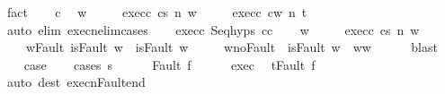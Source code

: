 \begin{isabellebody}
\ fact\isanewline
\ \ \isamarkupfalse%
\ c\ \isamarkupfalse%
\ w\ \isanewline
\ \ \ \ exec{\isacharunderscore}c{}{\isacharcolon}\ {\isachardoublequoteopen}{\isasymGamma}{\isasymturnstile}{\isasymlangle}c{}{\isacharcomma}s{\isasymrangle}\ {\isacharequal}n{\isasymRightarrow}\ w{\isachardoublequoteclose}\ \isanewline
\ \ \ \ exec{\isacharunderscore}c{}{\isacharcolon}\ {\isachardoublequoteopen}{\isasymGamma}{\isasymturnstile}{\isasymlangle}c{}{\isacharcomma}w{\isasymrangle}\ {\isacharequal}n{\isasymRightarrow}\ t{\isachardoublequoteclose}\isanewline
\ \ \ \ \isamarkupfalse%
\ {\isacharparenleft}auto\ elim{\isacharcolon}\ execn{\isacharunderscore}elim{\isacharunderscore}cases{\isacharparenright}\isanewline
\ \ \isamarkupfalse%
\ exec{\isacharunderscore}c{}\ Seq{\isachardot}hyps\ c{}{\isacharunderscore}c{}{\isacharprime}\isanewline
\ \ \isamarkupfalse%
\ w{\isacharprime}\ \isanewline
\ \ \ \ exec{\isacharunderscore}c{}{\isacharprime}{\isacharcolon}\ {\isachardoublequoteopen}{\isasymGamma}{\isasymturnstile}{\isasymlangle}c{}{\isacharprime}{\isacharcomma}s{\isasymrangle}\ {\isacharequal}n{\isasymRightarrow}\ w{\isacharprime}{\isachardoublequoteclose}\ \isanewline
\ \ \ \ w{\isacharunderscore}Fault{\isacharcolon}\ {\isachardoublequoteopen}isFault\ w\ {\isasymlongrightarrow}\ isFault\ w{\isacharprime}{\isachardoublequoteclose}\ \isanewline
\ \ \ \ w{\isacharprime}{\isacharunderscore}noFault{\isacharcolon}\ {\isachardoublequoteopen}{\isasymnot}\ isFault\ w{\isacharprime}\ {\isasymlongrightarrow}\ w{\isacharprime}{\isacharequal}w{\isachardoublequoteclose}\isanewline
\ \ \ \ \isamarkupfalse%
\ blast\isanewline
\ \ \isamarkupfalse%
\ {\isacharquery}case\isanewline
\ \ \isamarkupfalse%
\ {\isacharparenleft}cases\ {\isachardoublequoteopen}s{\isachardoublequoteclose}{\isacharparenright}\isanewline
\ \ \ \ \isamarkupfalse%
\ {\isacharparenleft}Fault\ f{\isacharparenright}\isanewline
\ \ \ \ \isamarkupfalse%
\ exec\ \isamarkupfalse%
\ {\isachardoublequoteopen}t{\isacharequal}Fault\ f{\isachardoublequoteclose}\isanewline
\ \ \ \ \ \ \isamarkupfalse%
\ {\isacharparenleft}auto\ dest{\isacharcolon}\ execn{\isacharunderscore}Fault{\isacharunderscore}end{\isacharparenright}\isanewline
\ \ \ \ \isamarkupfalse%

\end{isabellebody}
